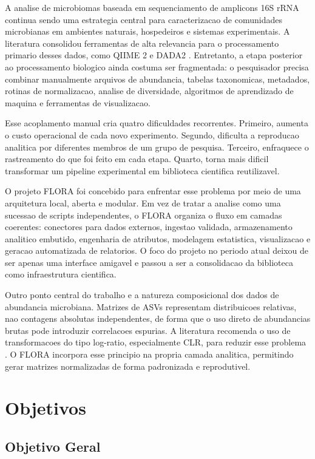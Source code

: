 \documentclass[12pt,a4paper]{article}
\begin{document}
A analise de microbiomas baseada em sequenciamento de amplicons 16S rRNA continua sendo uma estrategia central para caracterizacao de comunidades microbianas em ambientes naturais, hospedeiros e sistemas experimentais. A literatura consolidou ferramentas de alta relevancia para o processamento primario desses dados, como QIIME 2 \cite{bolyen2019} e DADA2 \cite{callahan2016}. Entretanto, a etapa posterior ao processamento biologico ainda costuma ser fragmentada: o pesquisador precisa combinar manualmente arquivos de abundancia, tabelas taxonomicas, metadados, rotinas de normalizacao, analise de diversidade, algoritmos de aprendizado de maquina e ferramentas de visualizacao.

Esse acoplamento manual cria quatro dificuldades recorrentes. Primeiro, aumenta o custo operacional de cada novo experimento. Segundo, dificulta a reproducao analitica por diferentes membros de um grupo de pesquisa. Terceiro, enfraquece o rastreamento do que foi feito em cada etapa. Quarto, torna mais dificil transformar um pipeline experimental em biblioteca cientifica reutilizavel.

O projeto FLORA foi concebido para enfrentar esse problema por meio de uma arquitetura local, aberta e modular. Em vez de tratar a analise como uma sucessao de scripts independentes, o FLORA organiza o fluxo em camadas coerentes: conectores para dados externos, ingestao validada, armazenamento analitico embutido, engenharia de atributos, modelagem estatistica, visualizacao e geracao automatizada de relatorios. O foco do projeto no periodo atual deixou de ser apenas uma interface amigavel e passou a ser a consolidacao da biblioteca como infraestrutura cientifica.

Outro ponto central do trabalho e a natureza composicional dos dados de abundancia microbiana. Matrizes de ASVs representam distribuicoes relativas, nao contagens absolutas independentes, de forma que o uso direto de abundancias brutas pode introduzir correlacoes espurias. A literatura recomenda o uso de transformacoes do tipo log-ratio, especialmente CLR, para reduzir esse problema \cite{gloor2017}. O FLORA incorpora esse principio na propria camada analitica, permitindo gerar matrizes normalizadas de forma padronizada e reprodutivel.

\section{Objetivos}

\subsection{Objetivo Geral}
\end{document}

